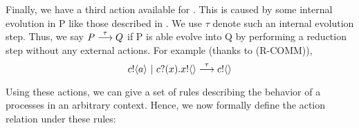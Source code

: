 Finally, we have a third action available for . This is caused by some internal evolution in P like those described in .  We use $\tau$ denote such an internal evolution step.  Thus, we say $P \overset{{\tau}}{\longrightarrow} Q$ if P is able evolve into Q by performing a reduction step without any external actions.  For example (thanks to (R-COMM)),
\[
	{c}!\langle{a}\rangle \ |\  {c}?({x}).{x}!\langle{}\rangle \overset{{\tau}}{\longrightarrow} {c}!\langle{}\rangle 
\]

Using these actions, we can give a set of rules describing the behavior of a \picalc processes in an arbitrary context.  Hence, we now formally define the action relation under these rules:
